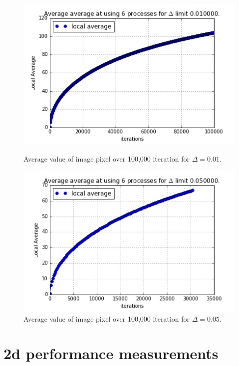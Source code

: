 \documentclass[11pt]{article}
\begin{document}
	\begin{figure}[H]	
		\centering
		\begin{minipage}[b]{.5\textwidth}
			\centering
			\includegraphics[width=\linewidth]{local_avg_6_010000.jpeg}
			\caption{Average value of image pixel over 100,000 iteration for $\Delta=0.01$.}\label{avg1}
		\end{minipage}%
		\begin{minipage}[b]{.5\textwidth}
			\centering
			\includegraphics[width=\linewidth]{local_avg_6_050000.jpeg}
			\caption{Average value of image pixel over 100,000 iteration for $\Delta=0.05$.}\label{avg2}
		\end{minipage}
	\end{figure}
	
	
	\section{2d performance measurements}
	
\end{document}
